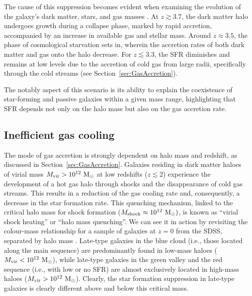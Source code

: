 \documentclass[baaa]{baaa}
\begin{document}
The cause of this suppression becomes evident when examining the evolution of the galaxy's dark matter, stars, and gas masses \citep[see figure 11 in][]{Feldmann_2015}. At $z \gtrsim 3.7$, the dark matter halo undergoes growth during a collapse phase, marked by rapid accretion, accompanied by an increase in available gas and stellar mass. Around $z\approx 3.5$, the phase of cosmological starvation sets in, wherein the accretion rates of both dark matter and gas onto the halo decrease. 
For $z \lesssim 3.3$, the SFR diminishes and remains at low levels due to the accretion of cold gas from large radii, specifically through the cold streams (see Section~\ref{sec:GasAccretion}). 

The notably aspect of this scenario is its ability to explain the coexistence of star-forming and passive galaxies within a given mass range, highlighting that SFR depends not only on the halo mass but also on the gas accretion rate.

\subsection{Inefficient gas cooling}
\label{Sec:InefficientGasCooling}

The mode of gas accretion is strongly dependent on halo mass and redshift, as discussed in Section~\ref{sec:GasAccretion}. Galaxies residing in dark matter haloes of virial mass $M_{\rm vir} > 10^{12}~{\rm M}_{\odot}$ at low redshifts ($z\lesssim 2$) experience the development of a hot gas halo through shocks and the disappearance of cold gas streams. This results in a reduction of the gas cooling rate and, consequently, a decrease in the star formation rate. This quenching mechanism, linked to the critical halo mass for shock formation ($M_{\rm shock} \approx 10^{12}~{\rm M}_{\odot})$, is known as ``virial shock heating'' or  ``halo mass quenching''.  
We can see it in action by revisiting the colour-mass relationship for a sample of galaxies at $z=0$ from the SDSS, separated by halo mass \citep[see figure 10 in][]{Schawinski_2014}.
Late-type galaxies in the blue cloud (i.e., those located along the main sequence) are predominantly found in low-mass haloes ($M_{\rm vir} < 10^{12}~{\rm M}_{\odot}$), while late-type galaxies in the green valley and the red sequence (i.e., with low or no SFR) are almost exclusively located in high-mass haloes ($M_{\rm vir} > 10^{12}~{\rm M}_{\odot}$). Clearly, the star formation suppression in late-type galaxies is clearly different above and below this critical mass.
\end{document}
